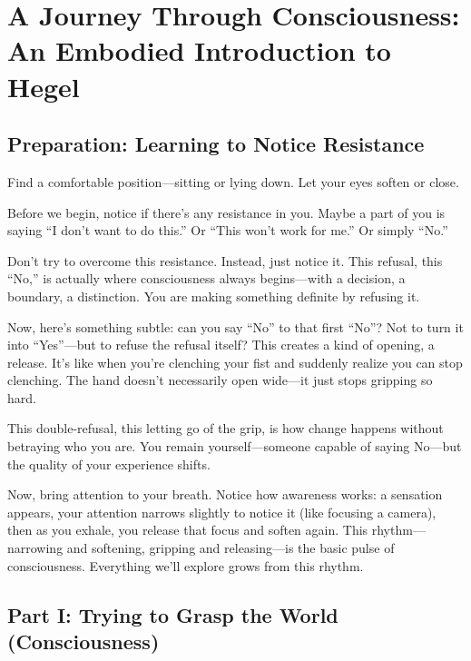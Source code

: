 \section{A Journey Through Consciousness: An Embodied Introduction to Hegel}\label{a-journey-through-consciousness-an-embodied-introduction-to-hegel}

\subsection{Preparation: Learning to Notice Resistance}\label{preparation-learning-to-notice-resistance}

Find a comfortable position---sitting or lying down. Let your eyes soften or close.

Before we begin, notice if there's any resistance in you. Maybe a part of you is saying ``I don't want to do this.'' Or ``This won't work for me.'' Or simply ``No.''

Don't try to overcome this resistance. Instead, just notice it. This refusal, this ``No,'' is actually where consciousness always begins---with a decision, a boundary, a distinction. You are making something definite by refusing it.

Now, here's something subtle: can you say ``No'' to that first ``No''? Not to turn it into ``Yes''---but to refuse the refusal itself? This creates a kind of opening, a release. It's like when you're clenching your fist and suddenly realize you can stop clenching. The hand doesn't necessarily open wide---it just stops gripping so hard.

This double-refusal, this letting go of the grip, is how change happens without betraying who you are. You remain yourself---someone capable of saying No---but the quality of your experience shifts.

Now, bring attention to your breath. Notice how awareness works: a sensation appears, your attention narrows slightly to notice it (like focusing a camera), then as you exhale, you release that focus and soften again. This rhythm---narrowing and softening, gripping and releasing---is the basic pulse of consciousness. Everything we'll explore grows from this rhythm.

\subsection{Part I: Trying to Grasp the World (Consciousness)}\label{part-i-trying-to-grasp-the-world-consciousness}

